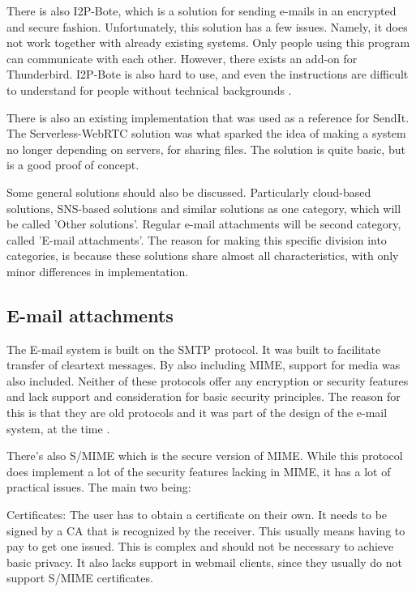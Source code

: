 There is also I2P-Bote, which is a solution for sending e-mails in an encrypted and secure fashion. Unfortunately, this solution has a few issues. Namely, it does not work together with already existing systems. Only people using this program can communicate with each other. However, there exists an add-on for Thunderbird. I2P-Bote is also hard to use, and even the instructions are difficult to understand for people without technical backgrounds \cite{url_I2PBote,url_I2PInfo}.

There is also an existing implementation that was used as a reference for SendIt. The Serverless-WebRTC solution \cite{url_webrtc_ex} was what sparked the idea of making a system no longer depending on servers, for sharing files. The solution is quite basic, but is a good proof of concept.

Some general solutions should also be discussed. Particularly cloud-based solutions, SNS-based solutions and similar solutions as one category, which will be called 'Other solutions'. Regular e-mail attachments will be second category, called 'E-mail attachments'. The reason for making this specific division into categories, is because these solutions share almost all characteristics, with only minor differences in implementation. 
%
%
\subsection{E-mail attachments}
\label{sec:intro_email}
The E-mail system is built on the SMTP protocol. It was built to facilitate transfer of cleartext messages. By also including MIME, support for media was also included. Neither of these protocols offer any encryption or security features and lack support and consideration for basic security principles. The reason for this is that they are old protocols and it was part of the design of the e-mail system, at the time \cite{partridgeTechnicalDevelopmentInternet2008}.

There's also S/MIME which is the secure version of MIME. While this protocol does implement a lot of the security features lacking in MIME, it has a lot of practical issues. The main two being:

Certificates: The user has to obtain a certificate on their own. It needs to be signed by a CA that is recognized by the receiver. This usually means having to pay to get one issued. This is complex and should not be necessary to achieve basic privacy. It also lacks support in webmail clients, since they usually do not support S/MIME certificates.


